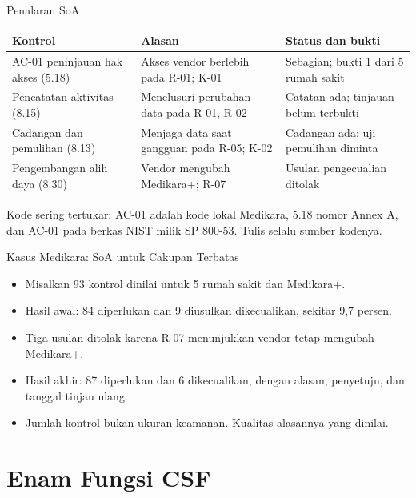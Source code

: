\documentclass[aspectratio=169, table, 12pt]{beamer}
\begin{document}
\begin{frame}{{\Large Penalaran SoA}}
  \vspace{2pt}
  \scriptsize
  \begin{tabularx}{\textwidth}{|>{\raggedright\arraybackslash}p{}|>{\raggedright\arraybackslash}X|>{\raggedright\arraybackslash}X|}
    \hline
    \textbf{Kontrol} & \textbf{Alasan} & \textbf{Status dan bukti} \\ \hline
    AC-01 peninjauan hak akses (5.18) & Akses vendor berlebih pada R-01; K-01 & Sebagian; bukti 1 dari
    5 rumah sakit \\ \hline
    Pencatatan aktivitas (8.15) & Menelusuri perubahan data pada R-01, R-02 & Catatan ada; tinjauan
    belum terbukti \\ \hline
    Cadangan dan pemulihan (8.13) & Menjaga data saat gangguan pada R-05; K-02 & Cadangan ada; uji
    pemulihan diminta \\ \hline
    Pengembangan alih daya (8.30) & Vendor mengubah Medikara+; R-07 & Usulan pengecualian ditolak \\
    \hline
  \end{tabularx}

  \vspace{8pt}
  \small Kode sering tertukar: AC-01 adalah kode lokal Medikara, 5.18 nomor Annex A, dan AC-01 pada
  berkas NIST milik SP 800-53. Tulis selalu sumber kodenya.
\end{frame}

\begin{frame}{{\Large Kasus Medikara: SoA untuk Cakupan Terbatas}}
  \vspace{6pt}
  \small
  \begin{itemize}
    \item Misalkan 93 kontrol dinilai untuk 5 rumah sakit dan Medikara+.
    \item Hasil awal: 84 diperlukan dan 9 diusulkan dikecualikan, sekitar 9,7 persen.
    \item Tiga usulan ditolak karena R-07 menunjukkan vendor tetap mengubah Medikara+.
    \item Hasil akhir: 87 diperlukan dan 6 dikecualikan, dengan alasan, penyetuju, dan tanggal tinjau
          ulang.
    \item Jumlah kontrol bukan ukuran keamanan. Kualitas alasannya yang dinilai.
  \end{itemize}
\end{frame}

\section{Enam Fungsi CSF}
\end{document}
